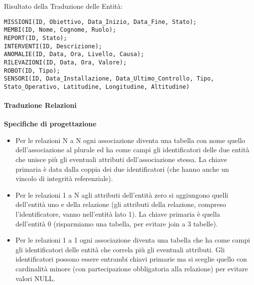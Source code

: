 \documentclass{article}
\begin{document}
Risultato della Traduzione delle Entità:
\begin{verbatim}
MISSIONI(ID, Obiettivo, Data_Inizio, Data_Fine, Stato);
MEMBI(ID, Nome, Cognome, Ruolo);
REPORT(ID, Stato);
INTERVENTI(ID, Descrizione);
ANOMALIE(ID, Data, Ora, Livello, Causa);
RILEVAZIONI(ID, Data, Ora, Valore);
ROBOT(ID, Tipo);
SENSORI(ID, Data_Installazione, Data_Ultimo_Controllo, Tipo, Stato_Operativo, Latitudine, Longitudine, Altitudine)
\end{verbatim}

\paragraph{Traduzione Relazioni}

\textbf{Specifiche di progettazione}
\begin{itemize}
    \item Per le relazioni N a N ogni associazione diventa una tabella con nome quello dell’associazione al plurale ed ha come campi gli identificatori delle due entità che unisce più gli eventuali attributi dell’associazione stessa. La chiave primaria è data dalla coppia dei due identificatori (che hanno anche un vincolo di integrità referenziale).
    \item Per le relazioni 1 a N agli attributi dell’entità zero si aggiungono quelli dell’entità uno e della relazione (gli attributi della relazione, compreso l’identificatore, vanno nell’entità lato 1). La chiave primaria è quella dell’entità 0 (risparmiamo una tabella, per evitare join a 3 tabelle).
    \item Per le relazioni 1 a 1 ogni associazione diventa una tabella che ha come campi gli identificatori delle entità che correla più gli eventuali attributi. Gli identificatori possono essere entrambi chiavi primarie ma si sceglie quello con cardinalità minore (con partecipazione obbligatoria alla relazione) per evitare valori NULL.
\end{itemize}
\end{document}
